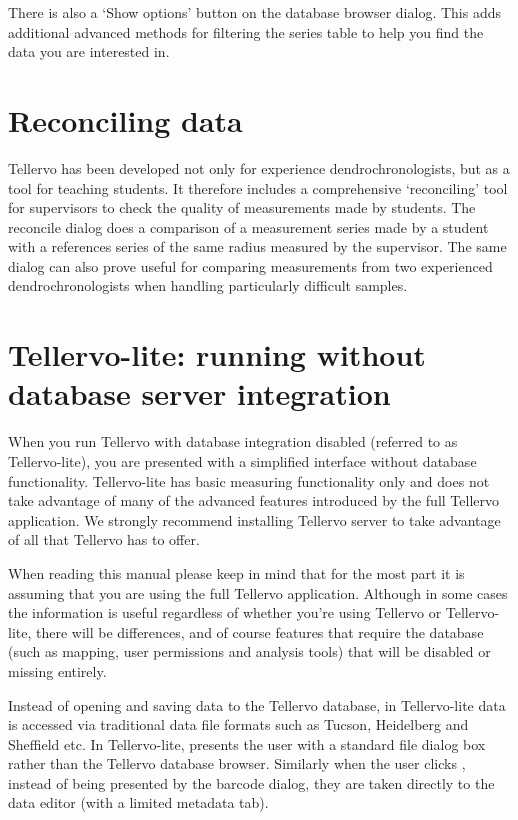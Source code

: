 There is also a `Show options' button on the database browser dialog.  This adds additional advanced methods for filtering the series table to help you find the data you are interested in.

\section{Reconciling data}
Tellervo has been developed not only for experience dendrochronologists, but as a tool for teaching students.  It therefore includes a comprehensive `reconciling' tool for supervisors to check the quality of measurements made by students.  The reconcile dialog does a comparison of a measurement series made by a student with a references series of the same radius measured by the supervisor.  The same dialog can also prove useful for comparing measurements from two experienced dendrochronologists when handling particularly difficult samples.


\section[Tellervo-lite]{Tellervo-lite: running without database server integration}
\label{txt:tellervolite}
When you run Tellervo with database integration disabled (referred to as Tellervo-lite), you are presented with a simplified interface without database functionality. Tellervo-lite has basic measuring functionality only and does not take advantage of many of the advanced features introduced by the full Tellervo application.  We strongly recommend installing Tellervo server to take advantage of all that Tellervo has to offer.

When reading this manual please keep in mind that for the most part it is assuming that you are using the full Tellervo application.  Although in some cases the information is useful regardless of whether you're using Tellervo or Tellervo-lite, there will be differences, and of course features that require the database (such as mapping, user permissions and analysis tools) that will be disabled or missing entirely.  

Instead of opening and saving data to the Tellervo database, in Tellervo-lite data is accessed via traditional data file formats such as Tucson, Heidelberg and Sheffield etc.  In Tellervo-lite,  presents the user with a standard file dialog box rather than the Tellervo database browser.  Similarly when the user clicks , instead of being presented by the barcode dialog, they are taken directly to the data editor (with a limited metadata tab).   

